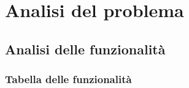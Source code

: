 \documentclass[a4paper]{article}
\begin{document}
\newpage


\section{Analisi del problema}

\subsection{Analisi delle funzionalità}

\subsubsection{Tabella delle funzionalità}
\end{document}
